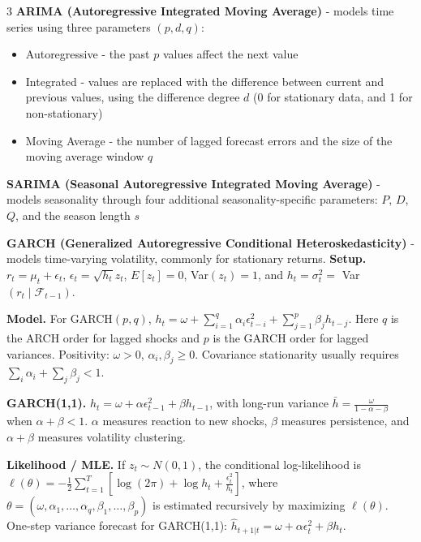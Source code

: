 \documentclass[10pt,landscape]{article}
\begin{document}
\begin{multicols}{3}
        \textbf{ARIMA (Autoregressive Integrated Moving Average)} - models time series using three parameters $(p,d,q)$:
        \begin{itemize}[label={--},leftmargin=4mm]
            \itemsep -.4mm
            \item Autoregressive - the past $p$ values affect the next value

            \item Integrated - values are replaced with the difference between current and previous values, using the difference degree $d$ (0 for stationary data, and 1 for non-stationary)

            \item Moving Average - the number of lagged forecast errors and the size of the moving average window $q$
        \end{itemize}

        \textbf{SARIMA (Seasonal Autoregressive Integrated Moving Average)} - models seasonality through four additional seasonality-specific parameters: $P$, $D$, $Q$, and the season length $s$
        \smallskip

        \textbf{GARCH (Generalized Autoregressive Conditional Heteroskedasticity)} - models time-varying volatility, commonly for stationary returns.
        \textbf{Setup.} $r_t=\mu_t+\epsilon_t$, $\epsilon_t=\sqrt{h_t}z_t$, $E[z_t]=0$, Var$(z_t)=1$, and $h_t=\sigma_t^2=$ Var$(r_t\mid\mathcal{F}_{t-1})$.
        \vspace{.2em}

        \textbf{Model.} For GARCH$(p,q)$,
        $\displaystyle h_t=\omega+\sum_{i=1}^{q}\alpha_i\epsilon_{t-i}^2+\sum_{j=1}^{p}\beta_j h_{t-j}$.
        Here $q$ is the ARCH order for lagged shocks and $p$ is the GARCH order for lagged variances.
        Positivity: $\omega>0$, $\alpha_i,\beta_j\geq0$. Covariance stationarity usually requires $\sum_i\alpha_i+\sum_j\beta_j<1$.
        \vspace{.2em}

        \textbf{GARCH(1,1).}
        $\displaystyle h_t=\omega+\alpha\epsilon_{t-1}^2+\beta h_{t-1}$, with long-run variance
        $\displaystyle \bar h=\frac{\omega}{1-\alpha-\beta}$ when $\alpha+\beta<1$.
        $\alpha$ measures reaction to new shocks, $\beta$ measures persistence, and $\alpha+\beta$ measures volatility clustering.
        \vspace{.2em}

        \textbf{Likelihood / MLE.} If $z_t\sim N(0,1)$, the conditional log-likelihood is
        $\displaystyle \ell(\theta)=-\frac12\sum_{t=1}^{T}\left[\log(2\pi)+\log h_t+\frac{\epsilon_t^2}{h_t}\right]$,
        where $\theta=(\omega,\alpha_1,\ldots,\alpha_q,\beta_1,\ldots,\beta_p)$ is estimated recursively by maximizing $\ell(\theta)$.
        One-step variance forecast for GARCH(1,1): $\hat h_{t+1|t}=\omega+\alpha\epsilon_t^2+\beta h_t$.
        \smallskip


\end{multicols}
\end{document}
